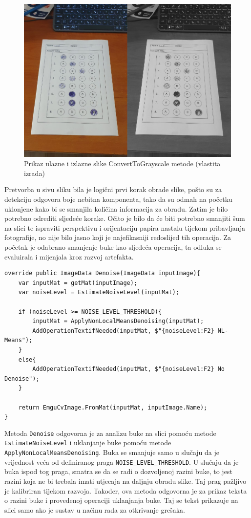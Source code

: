 \documentclass{foi}
\begin{document}
\begin{figure}[H]
\centering
\includegraphics[width=0.8\linewidth]{slike/ToGrayscale.png}
\caption{Prikaz ulazne i izlazne slike ConvertToGrayscale metode (vlastita izrada)}
\end{figure}

Pretvorba u sivu sliku bila je logični prvi korak obrade slike, pošto su za detekciju odgovora boje nebitna komponenta, tako da su odmah na početku uklonjene kako bi se smanjila količina informacija za obradu. Zatim je bilo potrebno odrediti sljedeće korake. Očito je bilo da će biti potrebno smanjiti šum na slici te ispraviti perspektivu i orijentaciju papira nastalu tijekom pribavljanja fotografije, no nije bilo jasno koji je najefikasniji redoslijed tih operacija. Za početak je odabrano smanjenje buke kao sljedeća operacija, ta odluka se evaluirala i mijenjala kroz razvoj artefakta.

\begin{lstlisting}[caption={Metoda za smanjenje buke na slici}]
override public ImageData Denoise(ImageData inputImage){
    var inputMat = getMat(inputImage);
    var noiseLevel = EstimateNoiseLevel(inputMat);

    if (noiseLevel >= NOISE_LEVEL_THRESHOLD){
        inputMat = ApplyNonLocalMeansDenoising(inputMat);
        AddOperationTextifNeeded(inputMat, $"{noiseLevel:F2} NL-Means");
    }
    else{
        AddOperationTextifNeeded(inputMat, $"{noiseLevel:F2} No Denoise");
    }

    return EmguCvImage.FromMat(inputMat, inputImage.Name);
}
\end{lstlisting}

Metoda \texttt{Denoise} odgovorna je za analizu buke na slici pomoću metode \texttt{EstimateNoiseLevel} i uklanjanje buke pomoću metode \texttt{ApplyNonLocalMeansDenoising}. Buka se smanjuje samo u slučaju da je vrijednost veća od definiranog praga \texttt{NOISE\_LEVEL\_THRESHOLD}. U slučaju da je buka ispod tog praga, smatra se da se radi o dozvoljenoj razini buke, to jest razini koja ne bi trebala imati utjecaja na daljnju obradu slike. Taj prag pažljivo je kalibriran tijekom razvoja. Također, ova metoda odgovorna je za prikaz teksta o razini buke i provedenoj operaciji uklanjanja buke. Taj se tekst prikazuje na slici samo ako je sustav u načinu rada za otkrivanje grešaka.
\end{document}
